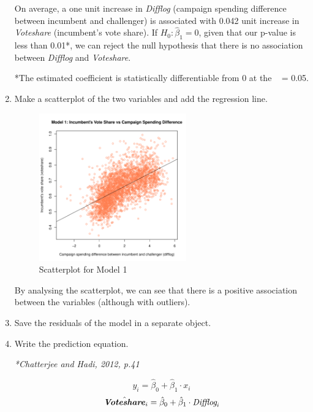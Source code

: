 \documentclass[12pt,letterpaper]{article}
\begin{document}
\begin{enumerate}
On average, a one unit increase in \textit{Difflog} (campaign spending difference between incumbent and challenger) is associated with 0.042 unit increase in \textit{Voteshare} (incumbent's vote share). If \(H_0: \hat{\beta}_1 = 0\), given that our p-value is less than 0.01*, we can reject the null hypothesis that there is no association between \textit{Difflog} and \textit{Voteshare}. 

*The estimated coefficient is statistically differentiable from 0 at the \alpha \  = 0.05.

		\item Make a scatterplot of the two variables and add the regression line. 
		
			 
			
		\begin{figure}[H]
			\centering
			\includegraphics[width=0.6\textwidth]{01.PS03_Skrypnyk_Plot1.pdf}
			\caption{Scatterplot for Model 1}
			\label{fig:Plot1}
		\end{figure}

By analysing the scatterplot, we can see that there is a positive association between the variables (although with outliers).
		
		\item Save the residuals of the model in a separate object.	
	 
	
		\item Write the prediction equation.
		
\textit{*Chatterjee and Hadi, 2012, p.41}
\begin{center}
	
	\[
	\hat{y_i} = \hat{\beta}_0 + \hat{\beta}_1 \cdot x_i
	\]
	\[\hat{\textbf{\textit{Voteshare}}}_i  = \hat{\beta}_0 + \hat{\beta}_1 \cdot  \textit{Difflog}_i
	\]
\end{center}


\end{enumerate}
\end{document}
